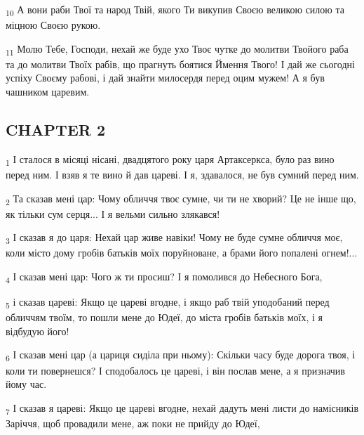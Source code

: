 \begin{tcolorbox}
\textsubscript{10} А вони раби Твої та народ Твій, якого Ти викупив Своєю великою силою та міцною Своєю рукою.
\end{tcolorbox}
\begin{tcolorbox}
\textsubscript{11} Молю Тебе, Господи, нехай же буде ухо Твоє чутке до молитви Твойого раба та до молитви Твоїх рабів, що прагнуть боятися Ймення Твого! І дай же сьогодні успіху Своєму рабові, і дай знайти милосердя перед оцим мужем! А я був чашником царевим.
\end{tcolorbox}
\subsection{CHAPTER 2}
\begin{tcolorbox}
\textsubscript{1} І сталося в місяці нісані, двадцятого року царя Артаксеркса, було раз вино перед ним. І взяв я те вино й дав цареві. І я, здавалося, не був сумний перед ним.
\end{tcolorbox}
\begin{tcolorbox}
\textsubscript{2} Та сказав мені цар: Чому обличчя твоє сумне, чи ти не хворий? Це не інше що, як тільки сум серця... І я вельми сильно злякався!
\end{tcolorbox}
\begin{tcolorbox}
\textsubscript{3} І сказав я до царя: Нехай цар живе навіки! Чому не буде сумне обличчя моє, коли місто дому гробів батьків моїх поруйноване, а брами його попалені огнем!...
\end{tcolorbox}
\begin{tcolorbox}
\textsubscript{4} І сказав мені цар: Чого ж ти просиш? І я помолився до Небесного Бога,
\end{tcolorbox}
\begin{tcolorbox}
\textsubscript{5} і сказав цареві: Якщо це цареві вгодне, і якщо раб твій уподобаний перед обличчям твоїм, то пошли мене до Юдеї, до міста гробів батьків моїх, і я відбудую його!
\end{tcolorbox}
\begin{tcolorbox}
\textsubscript{6} І сказав мені цар (а цариця сиділа при ньому): Скільки часу буде дорога твоя, і коли ти повернешся? І сподобалось це цареві, і він послав мене, а я призначив йому час.
\end{tcolorbox}
\begin{tcolorbox}
\textsubscript{7} І сказав я цареві: Якщо це цареві вгодне, нехай дадуть мені листи до намісників Заріччя, щоб провадили мене, аж поки не прийду до Юдеї,
\end{tcolorbox}

